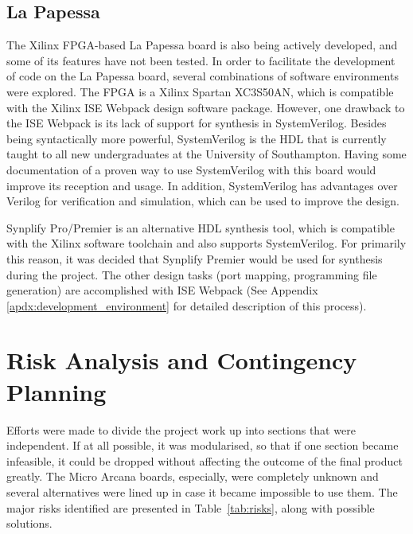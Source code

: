 	\subsection{La Papessa} %
	\label{sub:la_papessa_env}
		The Xilinx FPGA-based La Papessa board is also being actively developed, and some of its features have not been tested.  In order to facilitate the development of code on the La Papessa board, several combinations of software environments were explored.  The FPGA is a Xilinx Spartan XC3S50AN, which is compatible with the Xilinx ISE Webpack design software package.  However, one drawback to the ISE Webpack is its lack of support for synthesis in SystemVerilog. Besides being syntactically more powerful, SystemVerilog is the HDL that is currently taught to all new undergraduates at the University of Southampton. Having some documentation of a proven way to use SystemVerilog with this board would improve its reception and usage. In addition, SystemVerilog has advantages over Verilog for verification and simulation, which can be used to improve the design.

		Synplify Pro/Premier is an alternative HDL synthesis tool, which is compatible with the Xilinx software toolchain and also supports SystemVerilog. For primarily this reason, it was decided that Synplify Premier would be used for synthesis during the project.  The other design tasks (port mapping, programming file generation) are accomplished with ISE Webpack (See Appendix \ref{apdx:development_environment} for detailed description of this process).



\section{Risk Analysis and Contingency Planning} %
\label{sec:contingency_planning}
	Efforts were made to divide the project work up into sections that were independent.  If at all possible, it was modularised, so that if one section became infeasible, it could be dropped without affecting the outcome of the final product greatly.  The Micro Arcana boards, especially, were completely unknown and several alternatives were lined up in case it became impossible to use them.  The major risks identified are presented in Table~\ref{tab:risks}, along with possible solutions.

